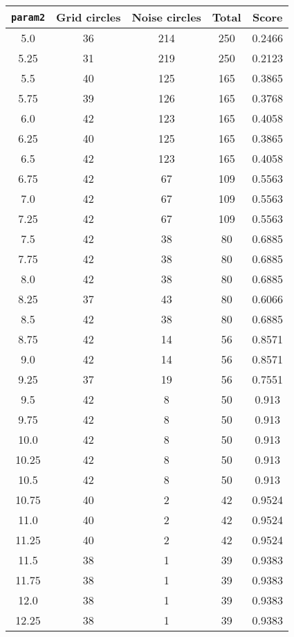 \documentclass[letterpaper, 12pt]{article}
\begin{document}
\begin{longtable}{|c|c|c|c|c|}
\hline
\textbf{\texttt{param2}} & \textbf{Grid circles} & \textbf{Noise circles} & \textbf{Total} & \textbf{Score} \\
\hline
5.0 & 36 & 214 & 250 & 0.2466 \\
\hline
5.25 & 31 & 219 & 250 & 0.2123 \\
\hline
5.5 & 40 & 125 & 165 & 0.3865 \\
\hline
5.75 & 39 & 126 & 165 & 0.3768 \\
\hline
6.0 & 42 & 123 & 165 & 0.4058 \\
\hline
6.25 & 40 & 125 & 165 & 0.3865 \\
\hline
6.5 & 42 & 123 & 165 & 0.4058 \\
\hline
6.75 & 42 & 67 & 109 & 0.5563 \\
\hline
7.0 & 42 & 67 & 109 & 0.5563 \\
\hline
7.25 & 42 & 67 & 109 & 0.5563 \\
\hline
7.5 & 42 & 38 & 80 & 0.6885 \\
\hline
7.75 & 42 & 38 & 80 & 0.6885 \\
\hline
8.0 & 42 & 38 & 80 & 0.6885 \\
\hline
8.25 & 37 & 43 & 80 & 0.6066 \\
\hline
8.5 & 42 & 38 & 80 & 0.6885 \\
\hline
8.75 & 42 & 14 & 56 & 0.8571 \\
\hline
9.0 & 42 & 14 & 56 & 0.8571 \\
\hline
9.25 & 37 & 19 & 56 & 0.7551 \\
\hline
9.5 & 42 & 8 & 50 & 0.913 \\
\hline
9.75 & 42 & 8 & 50 & 0.913 \\
\hline
10.0 & 42 & 8 & 50 & 0.913 \\
\hline
10.25 & 42 & 8 & 50 & 0.913 \\
\hline
10.5 & 42 & 8 & 50 & 0.913 \\
\hline
10.75 & 40 & 2 & 42 & 0.9524 \\
\hline
11.0 & 40 & 2 & 42 & 0.9524 \\
\hline
11.25 & 40 & 2 & 42 & 0.9524 \\
\hline
11.5 & 38 & 1 & 39 & 0.9383 \\
\hline
11.75 & 38 & 1 & 39 & 0.9383 \\
\hline
12.0 & 38 & 1 & 39 & 0.9383 \\
\hline
12.25 & 38 & 1 & 39 & 0.9383 \\
\hline

\end{longtable}
\end{document}
